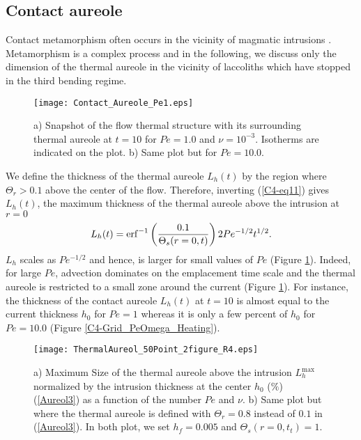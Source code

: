 \subsection{Contact aureole}
\label{sec:thermal-aureol}

Contact  metamorphism  often  occurs   in  the  vicinity  of  magmatic
intrusions
\citep{Jaeger:1959du,SILLITOE:1998bs,Senger:2014tt}. Metamorphism is a
complex process and in the following, we discuss only the dimension of
the thermal aureole  in the vicinity of laccoliths  which have stopped
in the third bending regime.

\begin{figure}[h!]
  \begin{center}
    \graphicspath{ {/Users/thorey/Documents/These/Projet/Refroidissement/Skin_Model/Figure/Figure_Heating/} }
    \texttt{[image: Contact\_Aureole\_Pe1.eps]}
    \caption{a)  Snapshot  of  the  flow thermal  structure  with  its
      surrounding  thermal   aureole  at   $t=10$  for   $Pe=1.0$  and
      $\nu=10^{-3}$.  Isotherms  are indicated  on the plot.   b) Same
      plot but for $Pe=10.0$.}
    \label{Contact_Areuol2}
  \end{center}
\end{figure}

We define the thickness of the  thermal aureole $L_h(t)$ by the region
where  $\Theta_r>0.1$  above  the  center  of  the  flow.   Therefore,
inverting (\ref{C4-eq11}) gives $L_h(t)$, the maximum thickness of the
thermal aureole above the intrusion at $r=0$
\begin{equation}
  L_h(t)                                                           =
  \operatorname{erf}^{-1}\left(\frac{0.1}{\Theta_s(r=0,t)}\right)2Pe^{-1/2}t^{1/2}.
  \label{Aureol}
\end{equation}
$L_h$ scales as  $Pe^{-1/2}$ and hence, is larger for  small values of
$Pe$ (Figure \ref{Contact_Areuol2}). Indeed, for large $Pe$, advection
dominates on  the emplacement  time scale and  the thermal  aureole is
restricted   to   a   small    zone   around   the   current   (Figure
\ref{Contact_Areuol2}).  For  instance, the  thickness of  the contact
aureole $L_h(t)$  at $t=10$ is  almost equal to the  current thickness
$h_0$  for $Pe=1$  whereas  it is  only  a few  percent  of $h_0$  for
$Pe=10.0$ (Figure \ref{C4-Grid_PeOmega_Heating}).
\begin{figure}[h!]
  \begin{center}
    \graphicspath{ {/Users/thorey/Documents/These/Projet/Refroidissement/Skin_Model/Figure/Figure_Heating/} }
    \texttt{[image: ThermalAureol\_50Point\_2figure\_R4.eps]}
    \caption{a)  Maximum  Size  of   the  thermal  aureole  above  the
      intrusion   $L_h^{\text{max}}$  normalized   by  the   intrusion
      thickness  at  the  center  $h_0$ ($\%$)  (\ref{Aureol3})  as  a
      function of the  number $Pe$ and $\nu$.  b) Same  plot but where
      the thermal  aureole is  defined with $\Theta_r=0.8$  instead of
      $0.1$ in (\ref{Aureol3}).  In both  plot, we set $h_f=0.005$ and
      $\Theta_s(r=0,t_{t})=1$.}
    \label{PhaseHeatingContact}
  \end{center}
\end{figure}

